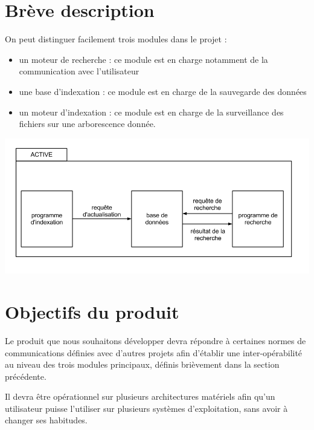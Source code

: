 \documentclass[a4paper,12pt]{report}
\begin{document}
\section{Brève description}
On peut distinguer facilement trois modules dans le projet :
\begin{itemize}
\item un moteur de recherche : ce module est en charge notamment de la communication avec l'utilisateur
\item une base d'indexation : ce module est en charge de la sauvegarde des données
\item un moteur d'indexation : ce module est en charge de la surveillance des \glspl{fichier} sur une \gls{arborescence} donnée.
\end{itemize}

\begin{center}
\includegraphics[scale=0.45]{"images/fonctionnement_global_d'active"}
\label{fonctionnement-global}
\end{center}

\section{Objectifs du produit}
Le produit que nous souhaitons développer devra répondre à certaines normes de communications définies avec d'autres projets afin d'établir une inter-opérabilité au niveau des trois modules principaux, définis brièvement dans la section précédente.

Il devra être opérationnel sur plusieurs architectures matériels afin qu'un utilisateur puisse l'utiliser sur plusieurs systèmes d'exploitation, sans avoir à changer ses habitudes.
\end{document}
